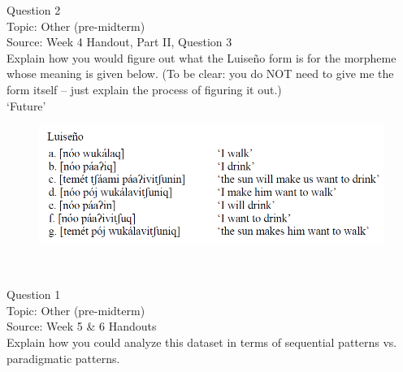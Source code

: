 \documentclass[12pt]{article}
\begin{document}
\newpage

{\large Question 2}\\

Topic: Other (pre-midterm)\\
Source: Week 4 Handout, Part II, Question 3\\

Explain how you would figure out what the Luiseño form is for the morpheme whose meaning is given below. (To be clear: you do NOT need to give me the form itself -- just explain the process of figuring it out.)\\

‘Future’

\begin{figure}[H]
\includegraphics{../images/luiseno.png}
\end{figure}

\newpage

\begin{center}
\textbf{{\color{red}{\HUGE END OF EXAM}}}\\

\end{center}
\newpage

\begin{center}
\textbf{{\color{blue}{\HUGE START OF EXAM\\}}}

\textbf{{\color{blue}{\HUGE Student ID: 11925\\}}}

\textbf{{\color{blue}{\HUGE 4:30\\}}}

\end{center}
\newpage

{\large Question 1}\\

Topic: Other (pre-midterm)\\
Source: Week 5 \& 6 Handouts\\

Explain how you could analyze this dataset in terms of sequential patterns vs. paradigmatic patterns.\\
\end{document}
